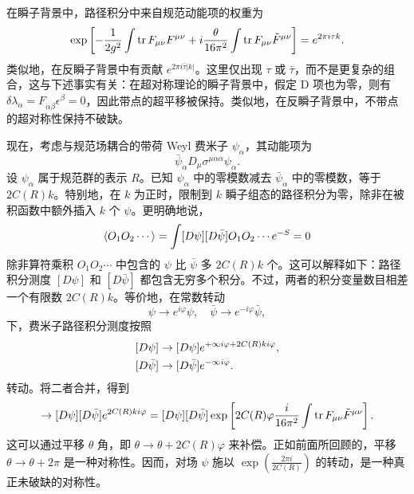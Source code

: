 在瞬子背景中，路径积分中来自规范动能项的权重为
\begin{equation}
\exp\left[
-\frac{1}{2g^2}\int \mathop{\mathrm{tr}}\nolimits F_{\mu\nu}F^{\mu\nu}
+
i\frac{\theta}{16\pi^2}\int \mathop{\mathrm{tr}}\nolimits F_{\mu\nu}\tilde F^{\mu\nu}
\right]
=e^{2\pi i \tau k}.\label{instanton_contri}
\end{equation}
类似地，在反瞬子背景中有贡献 $e^{2\pi i\bar\tau |k|}$。这里仅出现 $\tau$ 或 $\bar\tau$，而不是更复杂的组合，这与下述事实有关：在超对称理论的瞬子背景中，假定 D 项也为零，则有 $\delta\lambda_{\dot\alpha}=F_{\dot\alpha\dot\beta}\epsilon^{\dot\beta}=0$，因此带点的超平移被保持。类似地，在反瞬子背景中，不带点的超对称性保持不破缺。

现在，考虑与规范场耦合的带荷 Weyl 费米子 $\psi_\alpha$，其动能项为
\begin{equation}
\bar\psi_{\dot\alpha} {D}{}_\mu \sigma^{\mu \dot\alpha\alpha} \psi_\alpha.
\end{equation}
设 $\psi_\alpha$ 属于规范群的表示 $R$。已知 $\psi_\alpha$ 中的零模数减去 $\bar\psi_{\dot\alpha}$ 中的零模数，等于 $2C(R)k$。特别地，在 $k$ 为正时，限制到 $k$ 瞬子组态的路径积分为零，除非在被积函数中额外插入 $k$ 个 $\psi$。更明确地说，
\begin{equation}
\langle O_1O_2\cdots\rangle = \int [D\psi] [D\bar\psi] O_1O_2 \cdots e^{-S} =0
\end{equation}
除非算符乘积 $O_1O_2\cdots$ 中包含的 $\psi$ 比 $\bar\psi$ 多 $2C(R)k$ 个。这可以解释如下：路径积分测度 $[D\psi]$ 和 $[D\bar\psi]$ 都包含无穷多个积分。不过，两者的积分变量数目相差一个有限数 $2C(R)k$。等价地，在常数转动
\begin{equation}
\psi \to e^{i\varphi} \psi,\quad
\bar\psi \to e^{-i\varphi} \bar\psi,
\end{equation}
下，费米子路径积分测度按照
\begin{equation}
\begin{aligned}\relax
[D\psi] & \to [D\psi]e^{+\infty i\varphi + 2C(R)k i\varphi  }, \\
[D\bar\psi] & \to [D\bar\psi]e^{-\infty i\varphi }.
\end{aligned}
\end{equation}
转动。将二者合并，得到
\begin{equation}
[D\psi][D\bar\psi] \to [D\psi][D\bar\psi] e^{2C(R)k i\varphi} =
[D\psi][D\bar\psi] \exp\left[
2C(R)\varphi \frac{i}{16\pi^2}\int \tr F_{\mu\nu}\tilde F^{\mu\nu}
\right].
\end{equation}
这可以通过平移 $\theta$ 角，即 $\theta\to\theta+2C(R)\varphi$ 来补偿。正如前面所回顾的，平移 $\theta\to\theta+2\pi$ 是一种对称性。因而，对场 $\psi$ 施以 $\exp(\frac{2\pi i}{2C(R)})$ 的转动，是一种真正未破缺的对称性。

